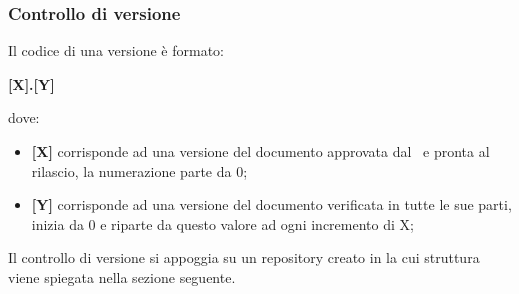 \subsubsection{Controllo di versione}\label{Versionamento}
Il codice di una versione è formato: 
\begin{center}
	\textbf{[X].[Y]}
\end{center}
dove:
\begin{itemize}
	\item \textbf{[X]} corrisponde ad una versione del documento approvata dal \Responsabile\ e pronta al rilascio, la numerazione parte da 0;
	\item \textbf{[Y]} corrisponde ad una versione del documento verificata in tutte le sue parti, inizia da 0 e riparte da questo valore ad ogni incremento di X;
\end{itemize}
Il controllo di versione si appoggia su un repository creato in  la cui struttura viene spiegata nella sezione seguente.

